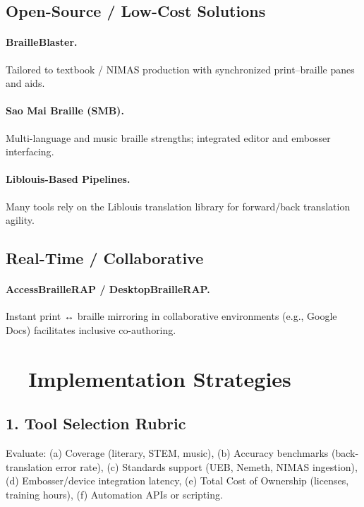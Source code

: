 \subsection{Open-Source / Low-Cost Solutions}
\paragraph{BrailleBlaster.} Tailored to textbook / NIMAS production with synchronized print–braille panes and  aids\supercite{BrailleBlaster, APHBrailleBlaster, APHBrailleBlasterFeatures, BANA}.

\paragraph{Sao Mai Braille (SMB).} Multi-language and music braille strengths; integrated editor and embosser interfacing\supercite{SaoMaiBraille, SMBHomepage, SMBNVDA}.

\paragraph{Liblouis-Based Pipelines.} Many tools rely on the Liblouis translation library for forward/back translation agility.

\subsection{Real-Time / Collaborative}
\paragraph{AccessBrailleRAP / DesktopBrailleRAP.} Instant print ↔ braille mirroring in collaborative environments (e.g., Google Docs) facilitates inclusive co-authoring\supercite{AccessBrailleRAP, BrailleRAPAccess, BrailleRAPOfficial}.

\section{~~Implementation Strategies}\label{ch12:sec:implementation-strategies}
\subsection*{1. Tool Selection Rubric}
Evaluate: (a) Coverage (literary, STEM, music), (b) Accuracy benchmarks (back-translation error rate), (c) Standards support (UEB, Nemeth, NIMAS ingestion), (d) Embosser/device integration latency, (e) Total Cost of Ownership (licenses, training hours), (f) Automation APIs or scripting.

